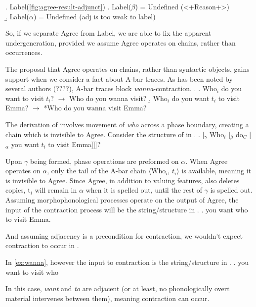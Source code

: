 \documentclass[MilwayThesis]{subfiles}
\begin{document}
\ex. Label(\ref{fig:agree-result-adjunct})
\a. Label($\beta$) = Undefined \hfill (<+Reason+>)\\
\b. Label($\alpha$) = Undefined \hfill(adj is too weak to label)

So, if we separate Agree from Label, we are able to fix the apparent undergeneration, provided we assume Agree operates on chains, rather than occurrences.

The proposal that Agree operates on chains, rather than syntactic objects, gains support when we consider a fact about A-bar traces.
As has been noted by several authors (????), A-bar traces block \textit{wanna}-contraction.
\ex.\label{ex:wanna-contraction}
\a.\label{ex:wanna} Who$_i$ do you want to visit $t_i$? $\rightarrow$ Who do you wanna visit?
\b.\label{exwant-to} Who$_i$ do you want $t_i$ to visit Emma? $\rightarrow$ *Who do you wanna visit Emma?

The derivation of \Last[b] involves movement of \textit{who} across a phase boundary, creating a chain which is invisible to Agree.
Consider the structure of \Last[b] in \Next.
\ex. \label{fig:star-wanna-tree}
[$_\gamma$ Who$_i$ [$_\beta$ do$_C$ [$_\alpha$ you want $t_i$ to visit Emma]]]?

Upon $\gamma$ being formed, phase operations are preformed on $\alpha$.
When Agree operates on $\alpha$, only the tail of the A-bar chain $\langle$Who$_i$, $t_i\rangle$ is available, meaning it is invisible to Agree.
Since Agree, in addition to valuing features, also deletes copies, t$_i$ will remain in $\alpha$ when it is spelled out, until the rest of $\gamma$ is spelled out.
Assuming morphophonological processes operate on the output of Agree, the input of the contraction process will be the string/structure in \Next.
\ex. you want who to visit Emma.

And assuming adjacency is a precondition for contraction, we wouldn't expect contraction to occur in \Last.

In \ref{ex:wanna}, however the input to contraction is the string/structure in \Next.
\ex. you want to visit who

In this case, \textit{want} and \textit{to} are adjacent (or at least, no phonologically overt material intervenes between them), meaning contraction can occur.
\end{document}
